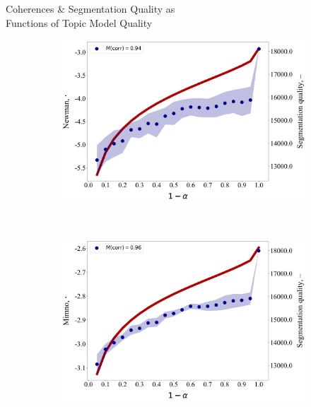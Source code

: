 \documentclass[russian]{beamer}
\begin{document}
\begin{frame}{Coherences \& Segmentation Quality as\\Functions of Topic Model Quality}
  
  \begin{figure}[h]
    \begin{subfigure}[t]{0.48\textwidth}
      \includegraphics[width=\linewidth]{newman-iteration.jpg}
    \end{subfigure}
    ~
    \begin{subfigure}[t]{0.48\textwidth}
      \includegraphics[width=\linewidth]{mimno-iteration.jpg}
    \end{subfigure}
    \begin{subfigure}[t]{0.48\textwidth}

\end{subfigure}
\end{figure}
\end{frame}
\end{document}
